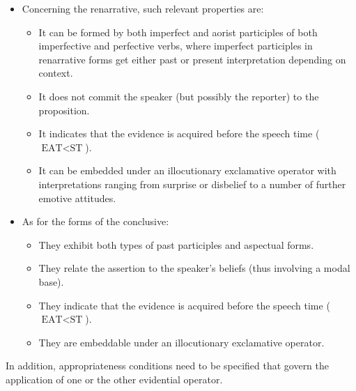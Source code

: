 \documentclass[output=paper,
colorlinks,
citecolor=brown,
newtxmath
]{langscibook}
\begin{document}
\begin{itemize}
    \item Concerning the renarrative, such relevant properties are:

    \begin{itemize}
        \item It can be formed by both imperfect and aorist participles of both imperfective and perfective verbs, where imperfect participles in renarrative forms get either past or present interpretation depending on context.
        \item It does not commit the speaker (but possibly the reporter) to the proposition.
        \item It indicates that the evidence is acquired before the speech time \linebreak ($
        \text{EAT}<\text{ST}$).
        \item It can be embedded under an illocutionary exclamative operator with interpretations ranging from surprise or disbelief to a number of further emotive attitudes.
        \end{itemize}

    \item As for the forms of the conclusive:
    \begin{itemize}
        \item They exhibit both types of past participles and aspectual forms.
        \item They relate the assertion to the speaker's beliefs (thus involving a modal base).
        \item They indicate that the evidence is acquired before the speech time ($
        \text{EAT}<\text{ST}$).
        \item They are embeddable under an illocutionary exclamative operator.
        \end{itemize}

    \end{itemize}

In addition, appropriateness conditions need to be specified that govern the application of one or the other evidential operator.

\end{document}
